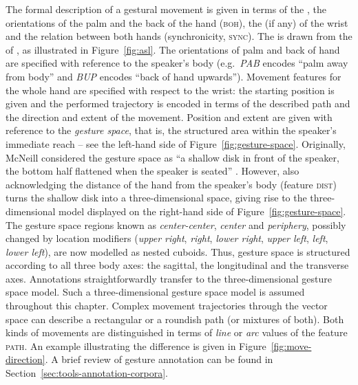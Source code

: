 \documentclass[output=paper,biblatex,babelshorthands,newtxmath,draftmode,colorlinks,citecolor=brown]{langscibook}
\begin{document}
\noindent The formal description of a gestural movement is given in terms of the ,
 the orientations of the palm  and the back of the hand
(\textsc{boh}),  the  (if any) of the wrist  and
the relation between both hands (synchronicity, \textsc{sync}). The  is
drawn from the  of , as illustrated in
Figure~\ref{fig:asl}.  The orientations  of palm and back of hand are specified with
reference to the speaker's body (e.g.\ \textit{PAB} encodes \enquote{palm away from body} and
\textit{BUP} encodes \enquote{back of hand upwards}).  Movement features for the whole hand are
specified with respect to the wrist: the starting position  is given and the
performed trajectory is encoded in terms of the described path  and the direction
 and extent  of the movement.  Position and extent are given with
reference to the \emph{gesture space}, that is, the structured area within the speaker's immediate
reach \citep[--89]{McNeill:1992} -- see the left-hand side of
Figure~\ref{fig:gesture-space}. Originally, McNeill considered the gesture space
as \enquote{a shallow disk in front of the speaker, the bottom half flattened when the speaker is
  seated} \citep[]{McNeill:1992}.  However, also acknowledging the distance of the hand from
the speaker's body (feature \textsc{dist}) turns the shallow disk into a three-dimensional space,
giving rise to the three-dimensional model displayed on the right-hand side of
Figure~\ref{fig:gesture-space}.  The gesture space regions known as \emph{center-center},
\emph{center} and \emph{periphery}, possibly changed by location modifiers (\emph{upper right},
\emph{right}, \emph{lower right}, \emph{upper left}, \emph{left}, \emph{lower left}), are now
modelled as nested cuboids.  Thus, gesture space is structured according to all three body axes: the
sagittal, the longitudinal and the transverse axes.  Annotations straightforwardly transfer to the
three-dimensional gesture space model.  Such a three-dimensional gesture space model is assumed
throughout this chapter.  Complex movement trajectories through the vector space can describe a
rectangular or a roundish path (or mixtures of both).  Both kinds of movements are distinguished in
terms of \textit{line}  or \textit{arc}  values of the feature
\textsc{path}. An example illustrating the difference is given in
Figure~\ref{fig:move-direction}.  A brief review of gesture annotation can be found in
Section~\ref{sec:tools-annotation-corpora}.\largerpage[2]
\end{document}
